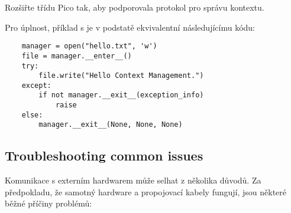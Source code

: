\begin{exercise}
    Rozšiřte třídu Pico tak, aby podporovala protokol pro správu kontextu.
\end{exercise}

Pro úplnost, příklad s  je v podstatě ekvivalentní následujícímu kódu:
\begin{lstlisting}
    manager = open("hello.txt", 'w')
    file = manager.__enter__()
    try:
        file.write("Hello Context Management.")
    except:
        if not manager.__exit__(exception_info)
            raise
    else:
        manager.__exit__(None, None, None)
\end{lstlisting}

\subsection{Troubleshooting common issues}
Komunikace s externím hardwarem může selhat z několika důvodů. Za předpokladu, že samotný hardware a propojovací kabely fungují, jsou některé běžné příčiny problémů:
